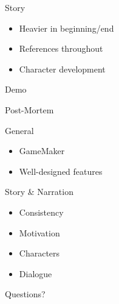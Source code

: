 \documentclass{../teamepsilon}
\begin{document}
\begin{frame}{Story}
    \begin{itemize}
        \item Heavier in beginning/end
        \item References throughout
        \item Character development
    \end{itemize}
\end{frame}


\begin{frame}[standout]
    \Huge
    Demo
\end{frame}

\begin{frame}[standout]
    \Huge
    Post-Mortem
\end{frame}


\begin{frame}{General}
    \begin{itemize}
        \item GameMaker
        \item Well-designed features
    \end{itemize}
\end{frame}

\begin{frame}{Story \& Narration}
    \begin{itemize}
        \item Consistency
        \item Motivation
        \item Characters
        \item Dialogue
    \end{itemize}
\end{frame}


\begin{frame}[standout]
    \Huge
    Questions?
\end{frame}
\end{document}
